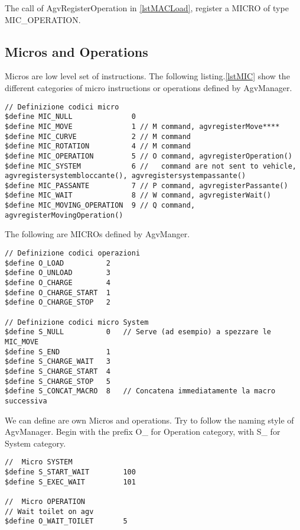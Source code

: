 The call of AgvRegisterOperation in \ref{lstMACLoad}, register a MICRO of type MIC\_OPERATION.
%
\subsection{Micros and Operations}
Micros are low level set of instructions. The following listing.\ref{lstMIC} show the different categories of micro instructions or operations defined by AgvManager. 

\begin{lstlisting}[caption= Different catergory of MIC defined in AgvManager, label=lstMIC]
// Definizione codici micro
$define MIC_NULL              0
$define MIC_MOVE              1 // M command, agvregisterMove****
$define MIC_CURVE             2 // M command
$define MIC_ROTATION          4 // M command
$define MIC_OPERATION         5 // O command, agvregisterOperation()
$define MIC_SYSTEM            6 //   command are not sent to vehicle, agvregistersystembloccante(), agvregistersystempassante()
$define MIC_PASSANTE          7 // P command, agvregisterPassante()
$define MIC_WAIT              8 // W command, agvregisterWait()
$define MIC_MOVING_OPERATION  9 // Q command, agvregisterMovingOperation()

\end{lstlisting}

The following are MICROs defined by AgvManger.

\begin{lstlisting}[caption= MICRO and OPERAIONS defined by AgvManager]
// Definizione codici operazioni
$define O_LOAD          2
$define O_UNLOAD        3
$define O_CHARGE        4
$define O_CHARGE_START  1
$define O_CHARGE_STOP   2

// Definizione codici micro System
$define S_NULL          0	// Serve (ad esempio) a spezzare le MIC_MOVE
$define S_END           1
$define S_CHARGE_WAIT   3
$define S_CHARGE_START  4
$define S_CHARGE_STOP   5
$define S_CONCAT_MACRO  8	// Concatena immediatamente la macro successiva
\end{lstlisting}

We can define are own Micros and operations. Try to follow the naming style of AgvManager. Begin with the prefix O\_ for Operation category, with S\_ for System category.

\begin{lstlisting}[caption= MICRO and OPERAIONS defined by user]
//	Micro SYSTEM
$define S_START_WAIT		100
$define S_EXEC_WAIT			101

//	Micro OPERATION
// Wait toilet on agv
$define O_WAIT_TOILET		5
\end{lstlisting}

